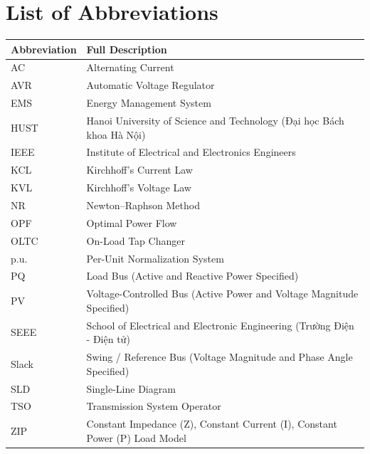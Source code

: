 \documentclass[12pt,a4paper,oneside]{report}
\begin{document}
\section*{List of Abbreviations}
\begin{longtable}{ll}
\toprule
\textbf{Abbreviation} & \textbf{Full Description} \\
\midrule
AC & Alternating Current \\
AVR & Automatic Voltage Regulator \\
EMS & Energy Management System \\
HUST & Hanoi University of Science and Technology (Đại học Bách khoa Hà Nội) \\
IEEE & Institute of Electrical and Electronics Engineers \\
KCL & Kirchhoff's Current Law \\
KVL & Kirchhoff's Voltage Law \\
NR & Newton--Raphson Method \\
OPF & Optimal Power Flow \\
OLTC & On-Load Tap Changer \\
p.u. & Per-Unit Normalization System \\
PQ & Load Bus (Active and Reactive Power Specified) \\
PV & Voltage-Controlled Bus (Active Power and Voltage Magnitude Specified) \\
SEEE & School of Electrical and Electronic Engineering (Trường Điện - Điện tử) \\
Slack & Swing / Reference Bus (Voltage Magnitude and Phase Angle Specified) \\
SLD & Single-Line Diagram \\
TSO & Transmission System Operator \\
ZIP & Constant Impedance (Z), Constant Current (I), Constant Power (P) Load Model \\
\bottomrule
\end{longtable}
\end{document}

